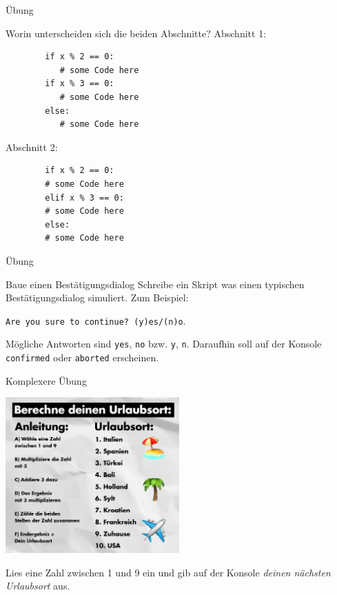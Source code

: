\begin{fragile}{Übung}
	\begin{block}{Worin unterscheiden sich die beiden Abschnitte?}
		\vspace{5pt}
		Abschnitt 1: 
		\begin{verbatim}
		if x % 2 == 0: 
		   # some Code here
		if x % 3 == 0: 
		   # some Code here
		else: 
		   # some Code here  
		\end{verbatim}
		Abschnitt 2: 
		\begin{verbatim}
		if x % 2 == 0: 
		# some Code here
		elif x % 3 == 0: 
		# some Code here
		else: 
		# some Code here  
		\end{verbatim}
	\end{block}
\end{fragile}

\begin{frame}{Übung}
\begin{block}{Baue einen Bestätigungsdialog}
\vspace{2pt}
Schreibe ein Skript was einen typischen Bestätigungsdialog simuliert. 
Zum Beispiel: 

\texttt{Are you sure to continue? (y)es/(n)o}. 

Mögliche Antworten sind \texttt{yes}, \texttt{no} bzw. \texttt{y}, \texttt{n}. 
Daraufhin soll auf der Konsole \texttt{confirmed} oder \texttt{aborted} erscheinen. 
\end{block}
\end{frame}

\begin{frame}{Komplexere Übung}
\begin{center}
\includegraphics[width=0.5\textwidth]{urlaubsort.png}
\end{center}
Lies eine Zahl zwischen 1 und 9 ein und gib auf der Konsole \emph{deinen nächsten Urlaubsort} aus. 
\end{frame}


